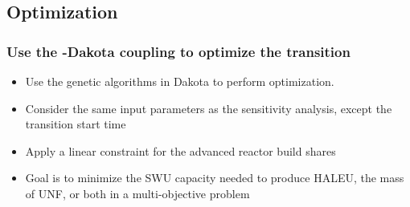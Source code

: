 \subsection{Optimization}
\begin{frame}
    \frametitle{Use the \Cyclus-Dakota coupling to optimize the transition}
    \begin{itemize}
        \item Use the genetic algorithms in Dakota to perform optimization.
        \item Consider the same input parameters as the sensitivity analysis, 
              except the transition start time
        \item<2-> Apply a linear constraint for the advanced reactor build shares
        \item<3-> Goal is to minimize the SWU capacity needed to 
             produce HALEU, the mass of \gls{UNF}, or both in a multi-objective 
             problem
    \end{itemize}
\end{frame}

